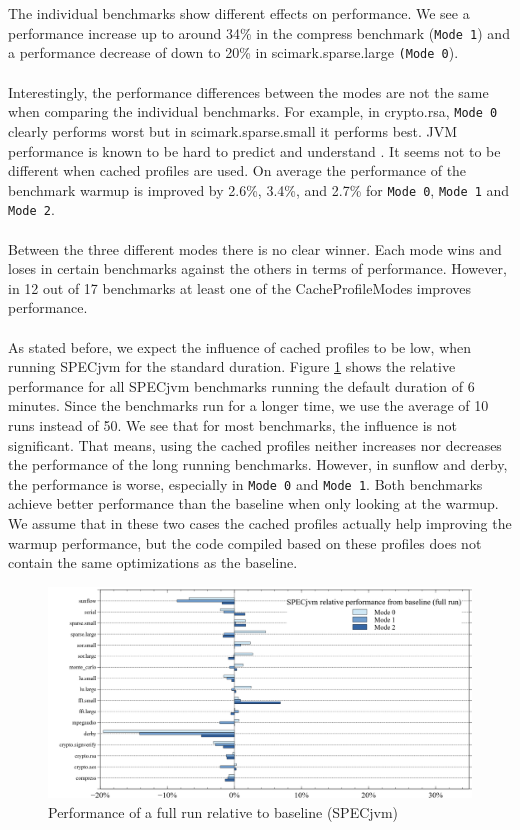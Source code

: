 \\\\
The individual benchmarks show different effects on performance. We see a performance increase up to around 34\% in the compress benchmark (\texttt{Mode 1}) and a performance decrease of down to 20\% in scimark.sparse.large \texttt{(Mode 0}).
\\\\
Interestingly, the performance differences between the modes are not the same when comparing the individual benchmarks. For example, in crypto.rsa, \texttt{Mode 0} clearly performs worst but in scimark.sparse.small it performs best.
JVM performance is known to be hard to predict and understand \cite{georges2007statistically}. It seems not to be different when cached profiles are used. On average the performance of the benchmark warmup is improved by 2.6\%, 3.4\%, and 2.7\% for \texttt{Mode 0}, \texttt{Mode 1} and \texttt{Mode 2}.
\\\\
Between the three different modes there is no clear winner. Each mode wins and loses in certain benchmarks against the others in terms of performance. However, in 12 out of 17 benchmarks at least one of the CacheProfileModes improves performance. 
\\\\
As stated before, we expect the influence of cached profiles to be low, when running SPECjvm for the standard duration. Figure \ref{f:all_full_variation} shows the relative performance for all SPECjvm benchmarks running the default duration of 6 minutes. Since the benchmarks run for a longer time, we use the average of 10 runs instead of 50.
We see that for most benchmarks, the influence is not significant. That means, using the cached profiles neither increases nor decreases the performance of the long running benchmarks. 
However, in sunflow and derby, the performance is worse, especially in \texttt{Mode 0} and \texttt{Mode 1}. Both benchmarks achieve better performance than the baseline when only looking at the warmup. We assume that in these two cases the cached profiles actually help improving the warmup performance, but the code compiled based on these profiles does not contain the same optimizations as the baseline.
\begin{figure}[ht]
  \begin{center}
    \centering
    \includegraphics[width=1.0\textwidth]{figures/all_full_variation.png}
    \caption{Performance of a full run relative to baseline (SPECjvm)}
    \label{f:all_full_variation}
  \end{center}
\end{figure} 
